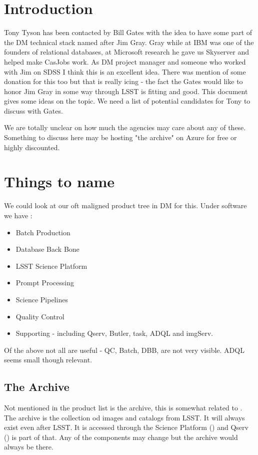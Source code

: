 \section{Introduction}
Tony Tyson has been contacted by Bill Gates with the idea to have some part of the DM technical stack named
after Jim Gray.  Gray while at IBM was one of the founders of relational databases, at Microsoft research he gave us
Skyserver and helped make CasJobs work.
As DM project manager and someone who worked with Jim on SDSS I think this is an excellent idea.  There was mention of some donation for this too but that is really icing - the fact the Gates would like to honor Jim Gray in some way through LSST is fitting and good. This document gives some ideas on the topic. We need a list of potential candidates for Tony to discuss with Gates.

We are totally unclear on how much the agencies may care about any of these.
Something to discuss here may be hosting "the archive" on Azure for free or highly discounted.

\section{Things to name}

We could look at our oft maligned product tree in DM for this. Under software we have :
\begin{itemize}
\item Batch Production
\item Database Back Bone
\item LSST Science Platform
\item Prompt Processing
\item Science Pipelines
\item Quality Control
\item Supporting - including Qserv, Butler, task, ADQL and imgServ.
\end{itemize}

Of the above not all are useful - QC, Batch, DBB, are not very visible. ADQL seems small though relevant.

\subsection {The Archive}
Not mentioned in the product list is the archive, this is somewhat related to . The archive is
the collection od images and catalogs from LSST. It will always exist even after LSST. It is accessed through the Science Platform () and Qserv () is part of that. Any of the components may change but the
archive would always be there.

